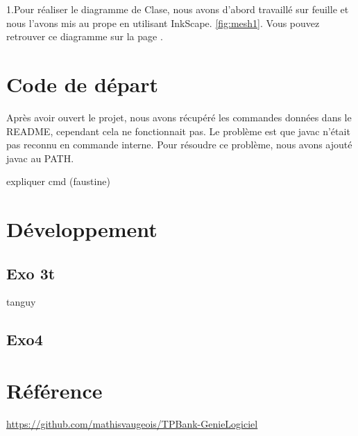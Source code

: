 \documentclass{article}
\begin{document}


1.Pour réaliser le diagramme de Clase, nous avons d'abord travaillé sur feuille et nous l'avons mis au prope en utilisant InkScape.  \ref{fig:mesh1}. Vous pouvez retrouver ce diagramme sur la page \pageref{fig:mesh1}.
\newline
\newpage
\section{Code de départ}
Après avoir ouvert le projet, nous avons récupéré les commandes données dans le README, cependant cela ne fonctionnait pas. Le problème est que javac n'était pas reconnu en commande interne. Pour résoudre ce problème, nous avons ajouté javac au PATH.

expliquer cmd (faustine)
\newpage
\section{Développement}
\subsection{Exo 3t}
tanguy
\subsection{Exo4}
\newpage
\section*{Référence}
\url{https://github.com/mathisvaugeois/TPBank-GenieLogiciel}
\end{document}
